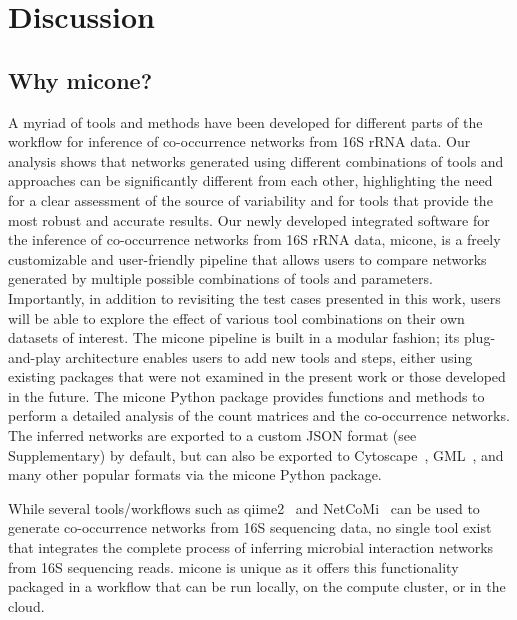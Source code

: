 
\section*{Discussion}

  \subsection*{Why \ac{micone}?}

  A myriad of tools and methods have been developed for different parts of the workflow for inference of co-occurrence networks from 16S rRNA data.
  Our analysis shows that networks generated using different combinations of tools and approaches can be significantly different from each other, highlighting the need for a clear assessment of the source of variability and for tools that provide the most robust and accurate results.
  Our newly developed integrated software for the inference of co-occurrence networks from 16S rRNA data, \ac{micone}, is a freely customizable and user-friendly pipeline that allows users to compare networks generated by multiple possible combinations of tools and parameters.
  Importantly, in addition to revisiting the test cases presented in this work, users will be able to explore the effect of various tool combinations on their own datasets of interest.
  The \ac{micone} pipeline is built in a modular fashion; its plug-and-play architecture enables users to add new tools and steps, either using existing packages that were not examined in the present work or those developed in the future.
  The \ac{micone} Python package provides functions and methods to perform a detailed analysis of the count matrices and the co-occurrence networks.
  The inferred networks are exported to a custom JSON format (see Supplementary) by default, but can also be exported to Cytoscape~\cite{shannonCytoscapeSoftwareEnvironment2003}, GML~\cite{himsoltGMLPortableGraph2010}, and many other popular formats via the \ac{micone} Python package.

  While several tools/workflows such as \ac{qiime2}~\cite{bolyenReproducibleInteractiveScalable2019} and NetCoMi~\cite{peschelNetCoMiNetworkConstruction2020} can be used to generate co-occurrence networks from 16S sequencing data, no single tool exist that integrates the complete process of inferring microbial interaction networks from 16S sequencing reads.
  \ac{micone} is unique as it offers this functionality packaged in a workflow that can be run locally, on the compute cluster, or in the cloud.

